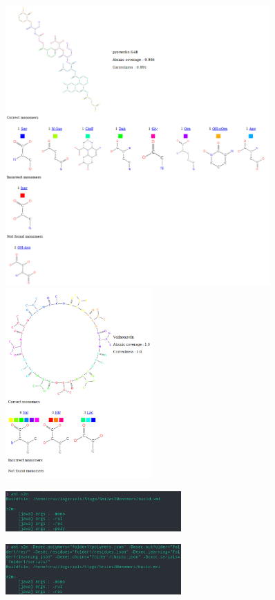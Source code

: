 \documentclass[11pt, a4paper]{report}
\begin{document}
	\begin{figure}[H]
		\centering
		\includegraphics[width=0.9\textwidth]{images/pyoverdin G4R.png}
		\hspace{2cm}
		\includegraphics[width=0.5\textwidth]{images/Valinomycin.png}
	\end{figure}
	
	\begin{figure}[H]
		\captionsetup{justification=centering}
		\centering
		\includegraphics[width=0.6\textwidth]{images/ants2m.png}
	\end{figure}
	\vspace{0.000000000001cm}
	\begin{figure}[H]
		\captionsetup{justification=centering}
		\centering
		\includegraphics[width=0.6\textwidth]{images/ants2m-D.png}
	\end{figure}
	
\end{document}
